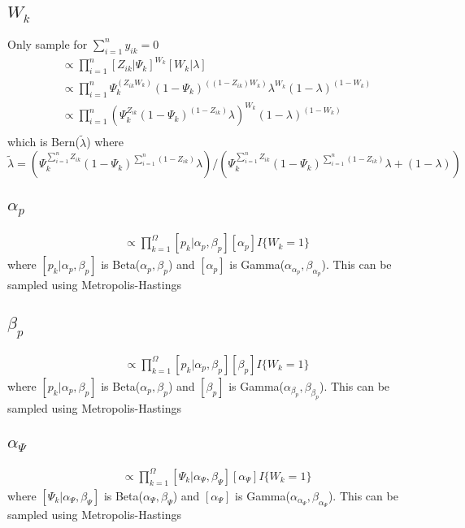 \documentclass[fleqn]{article}
\begin{document}
\subsection{$W_k$}
%
Only sample for $\sum_{i = 1}^{n} y_{ik} = 0$
%
\begin{align*}
  [W_k | \cdot] & \propto \prod_{i = 1}^n [Z_{ik} | \Psi_k]^{W_k} [W_k | \lambda]\\
  & \propto \prod_{i = 1}^n \Psi_k^{(Z_{ik} W_k)} (1 - \Psi_k)^{\left( (1 - Z_{ik}) W_k \right)} \lambda^{W_k} (1 - \lambda)^{(1 - W_k)}\\
  & \propto \prod_{i = 1}^n \left(\Psi_k^{Z_{ik}} (1 - \Psi_k)^{(1 - Z_{ik})} \lambda \right)^{W_k} (1 - \lambda)^{(1 - W_k)}\\
\end{align*}
%
which is Bern($\tilde{\lambda}$) where $\tilde{\lambda} = \left(\Psi_k^{\sum_{i = 1}^n Z_{ik}} (1 - \Psi_k)^{\sum_{i = 1}^n (1 - Z_{ik})} \lambda \right) / \left(\Psi_k^{\sum_{i = 1}^n Z_{ik}} (1 - \Psi_k)^{\sum_{i = 1}^n (1 - Z_{ik})} \lambda + (1 - \lambda) \right)$
%
\subsection{$\alpha_p$}
%
\begin{align*}
  [\alpha_p | \cdot] & \propto \prod_{k = 1}^\Omega [p_k | \alpha_p, \beta_p] [\alpha_p] I\{W_k = 1\}
\end{align*}
where $[p_k | \alpha_p, \beta_p]$ is Beta($\alpha_p, \beta_p$) and $[\alpha_p]$ is Gamma($\alpha_{\alpha_p}, \beta_{\alpha_p}$). This can be sampled using Metropolis-Hastings
%
\subsection{$\beta_p$}
%
\begin{align*}
  [\beta_p | \cdot] & \propto \prod_{k = 1}^\Omega [p_k | \alpha_p, \beta_p] [\beta_p] I\{W_k = 1\}
\end{align*}
where $[p_k | \alpha_p, \beta_p]$ is Beta($\alpha_p, \beta_p$) and $[\beta_p]$ is Gamma($\alpha_{\beta_p}, \beta_{\beta_p}$). This can be sampled using Metropolis-Hastings
%
\subsection{$\alpha_\Psi$}
%
\begin{align*}
  [\alpha_\Psi | \cdot] & \propto \prod_{k = 1}^\Omega [\Psi_k | \alpha_\Psi, \beta_\Psi] [\alpha_\Psi] I\{W_k = 1\}
\end{align*}
where $[\Psi_k | \alpha_\Psi, \beta_\Psi]$ is Beta($\alpha_\Psi, \beta_\Psi$) and $[\alpha_\Psi]$ is Gamma($\alpha_{\alpha_\Psi}, \beta_{\alpha_\Psi}$). This can be sampled using Metropolis-Hastings
%
\end{document}
